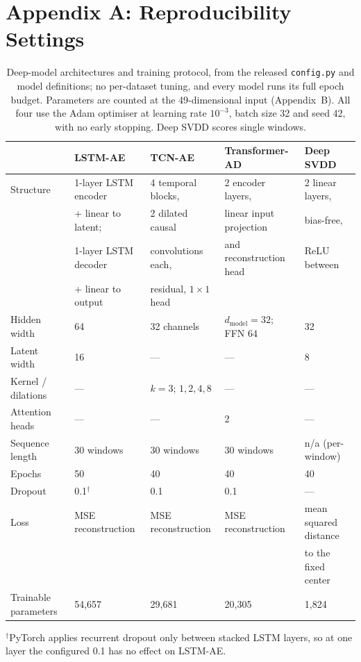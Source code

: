 \documentclass[IJPHM, 2026, 0]{PHMSociety}
\begin{document}


\FloatBarrier
\section*{Appendix A: Reproducibility Settings}
\begin{table}[t] \footnotesize
	\begin{center}
	\caption{Deep-model architectures and training protocol, from the released \texttt{config.py} and model definitions; no per-dataset tuning, and every model runs its full epoch budget. Parameters are counted at the 49-dimensional input (Appendix~B). All four use the Adam optimiser at learning rate $10^{-3}$, batch size 32 and seed 42, with no early stopping. Deep SVDD scores single windows.}
	\label{tab:deeparch}
	\begin{tabular}{l l l l l}
		\hline \hline
		 & \textbf{LSTM-AE} & \textbf{TCN-AE} & \textbf{Transformer-AD} & \textbf{Deep SVDD} \\
		\hline
		Structure & 1-layer LSTM encoder & 4 temporal blocks, & 2 encoder layers, & 2 linear layers, \\
		 & + linear to latent; & 2 dilated causal & linear input projection & bias-free, \\
		 & 1-layer LSTM decoder & convolutions each, & and reconstruction head & ReLU between \\
		 & + linear to output & residual, $1{\times}1$ head & & \\
		Hidden width & 64 & 32 channels & $d_{\text{model}}=32$; FFN 64 & 32 \\
		Latent width & 16 & --- & --- & 8 \\
		Kernel / dilations & --- & $k=3$; $1,2,4,8$ & --- & --- \\
		Attention heads & --- & --- & 2 & --- \\
		Sequence length & 30 windows & 30 windows & 30 windows & n/a (per-window) \\
		\hline
		Epochs & 50 & 40 & 40 & 40 \\
		Dropout & 0.1$^{\dagger}$ & 0.1 & 0.1 & --- \\
		Loss & MSE reconstruction & MSE reconstruction & MSE reconstruction & mean squared distance \\
		 & & & & to the fixed center \\
		\hline
		Trainable parameters & 54{,}657 & 29{,}681 & 20{,}305 & 1{,}824 \\
		\hline \hline
	\end{tabular}
	\end{center}
	{\footnotesize $^{\dagger}$PyTorch applies recurrent dropout only between stacked LSTM layers,
	so at one layer the configured 0.1 has no effect on LSTM-AE.}
\end{table}
\end{document}
